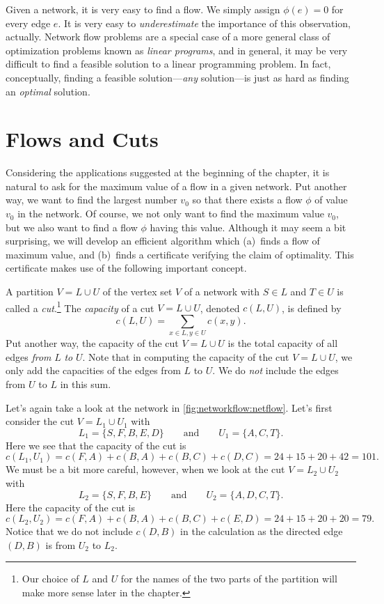 \begin{remark}
  Given a network, it is very easy to find a flow.  We simply assign
  $\phi(e)=0$ for every edge $e$. It is very easy to
  \textit{underestimate} the importance of this observation,
  actually. Network flow problems are a special case of a more general
  class of optimization problems known as \emph{linear programs}, and
  in general, it may be very difficult to find a feasible solution to
  a linear programming problem.  In fact, conceptually, finding a
  feasible solution---\textit{any} solution---is just as hard as
  finding an \textit{optimal} solution.
\end{remark}

\section{Flows and Cuts}

Considering the applications suggested at the beginning of the
chapter, it is natural to ask for the maximum value of a flow in a
given network. Put another way, we want to find the largest number
$v_0$ so that there exists a flow $\phi$ of value $v_0$ in the
network. Of course, we not only want to find the maximum value $v_0$,
but we also want to find a flow $\phi$ having this value.  Although it
may seem a bit surprising, we will develop an efficient algorithm
which (a)~finds a flow of maximum value, and (b)~finds a certificate
verifying the claim of optimality.  This certificate makes use of the
following important concept.

A partition $V=L\cup U$ of the vertex set $V$ of a network 
with $S\in L$ and $T\in U$ is called a
\textit{cut}.\footnote{Our choice of $L$ and $U$ for the names of the
  two parts of the partition will make more sense later in the
  chapter.}  The \textit{capacity} of a cut $V=L\cup U$, denoted
$c(L,U)$, is defined by
\[
c(L,U) = \sum_{x\in L,y\in U} c(x,y).
\]
Put another way, the capacity of the cut $V=L\cup U$ is the total
capacity of all edges \emph{from} $L$ \emph{to} $U$. Note that in
computing the capacity of the cut $V=L\cup U$, we only add the
capacities of the edges from $L$ to $U$.  We do \emph{not} include the
edges from $U$ to $L$ in this sum.

\begin{example}
  Let's again take a look at the network in
  \autoref{fig:networkflow:netflow}. Let's first consider the cut
  $V=L_1\cup U_1$ with
  \[L_1 = \{S,F,B,E,D\}\qquad\text{and}\qquad U_1= \{A,C,T\}.\]
  Here we see that the capacity of the cut is
  \[c(L_1,U_1) = c(F,A) + c(B,A) + c(B,C)+ c(D,C) = 24+15+20+42 =
  101.\]
  We must be a bit more careful, however, when we look at the cut
  $V=L_2\cup U_2$ with
  \[L_2 = \{S,F,B,E\}\qquad\text{and}\qquad U_2=\{A,D,C,T\}.\]
  Here the capacity of the cut is
  \[c(L_2,U_2) = c(F,A) + c(B,A) + c(B,C) + c(E,D) = 24+15+20+20=79.\]
  Notice that we do not include $c(D,B)$ in the calculation as the
  directed edge $(D,B)$ is from $U_2$ to $L_2$.
\end{example}

